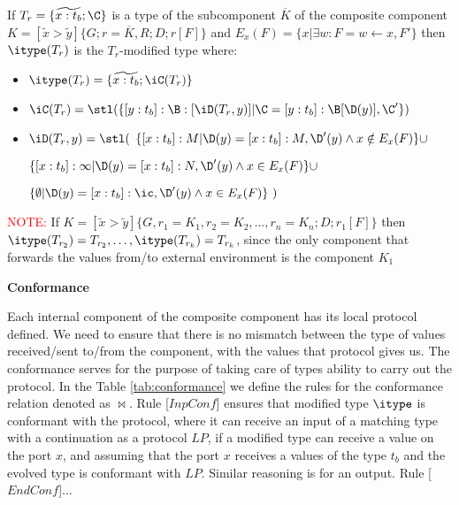 \begin{definition}
If $T_r=\{\widetilde{x:t_b};\C\}$ is a type of the subcomponent $\overline{K}$ of the composite component $K=[\tilde{x}>\tilde{y}]\{G;r=\overline{K},R;D;r[F]\}$ and $E_x(F)=\{x|\exists w: F=w\leftarrow x,F'\}$  then $\itype(T_r)$ is the $T_r$-modified type where:\\
\begin{itemize}
    \item $\itype(T_r)=\{\widetilde{x:t_b};\iC(T_r)\}$
    \item $\iC(T_r)=\stl(\{[y:t_b]:\B:[\iD(T_r,y)]|\C=[y:t_b]:\B[\D(y)],\C'\})$
    \item $\iD(T_r,y)=\stl ($ $\{[x:t_b]:M|\D(y)=[x:t_b]:M,\D'(y) \wedge x\notin E_x(F)\}\cup$  
    
 \hspace{2.7cm} $\{[x:t_b]:\infty|\D(y)=[x:t_b]:N,\D'(y) \wedge x\in E_x(F)\}\cup$
 
  \hspace{2.7cm} $ \{\emptyset|\D(y)=[x:t_b]:\ic,\D'(y)\wedge x\in E_x(F)\}\ )$
          
           
       
  
    
   
\end{itemize}


\textcolor{red}{NOTE:} If $K=[\tilde{x}>\tilde{y}]\{G,r_1=K_1,r_2=K_2,\dots,r_n=K_n;D;r_1[F]\}$ then $\itype(T_{r_2})=T_{r_2},\dots, \itype(T_{r_k})=T_{r_k}$, since the only component that forwards the values from/to external environment is the component $K_1$



\end{definition}
\vspace{0.5cm}

\textbf{Conformance}

Each internal component of the composite component has its local protocol defined. We need to ensure that there is no mismatch between the type of values received/sent to/from the component, with the values that protocol gives us. The conformance serves for the purpose of taking care of types ability to carry out the protocol. In the Table \ref{tab:conformance} we define the rules for the conformance relation denoted as $\bowtie$. Rule [$InpConf$] ensures that modified type $\itype$ is conformant with the protocol, where it can receive an input of a matching type with a continuation as a protocol $LP$, if a modified type can receive a value on the port $x$, and assuming that the port $x$ receives a values of the type $t_b$ and the evolved type is conformant with $LP$. Similar reasoning is for an output. Rule [$EndConf$]...





